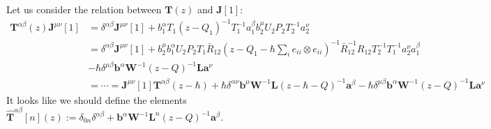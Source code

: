 \documentclass[11pt]{report}
\theoremstyle{definition}
\theoremstyle{remark}
\theoremstyle{remark}
\begin{document}

Let us consider the relation between $\mathbf{T}(z)$ and $\mathbf{J}[1]$:
\begin{align*}
\mathbf{T}^{\alpha\beta}(z) \mathbf{J}^{\mu\nu}[1]
&= \delta^{\alpha\beta} \mathbf{J}^{\mu\nu}[1] + b_1^\alpha T_1 (z-Q_1)^{-1} T_1^{-1} a_1^\beta b_2^\mu U_2 P_2 T_2^{-1} a_2^\nu \\
&= \delta^{\alpha\beta} \mathbf{J}^{\mu\nu}[1] + b_2^\mu b_1^\alpha U_2 P_2 T_1 \bar R_{12} (z-Q_1-\hbar\sum_i e_{ii} \otimes e_{ii})^{-1} \bar R_{12}^{-1} R_{12} T_2^{-1} T_1^{-1} a_2^\nu a_1^\beta \\
&- \hbar \delta^{\mu\beta} \mathbf{b}^\alpha \mathbf{W}^{-1} (z-Q)^{-1} \mathbf{L} \mathbf{a}^\nu \\
&= \cdots = \mathbf{J}^{\mu\nu}[1] \mathbf{T}^{\alpha\beta}(z-\hbar) + \hbar \delta^{\alpha\nu} \mathbf{b}^\mu \mathbf{W}^{-1} \mathbf{L} (z-\hbar-Q)^{-1} \mathbf{a}^\beta - \hbar \delta^{\mu\beta} \mathbf{b}^\alpha \mathbf{W}^{-1} (z-Q)^{-1} \mathbf{L} \mathbf{a}^\nu
\end{align*}
It looks like we should define the elements $\widehat{\mathbf{T}}^{\alpha\beta}[n](z) := \delta_{0n} \delta^{\alpha\beta} + \mathbf{b}^\alpha \mathbf{W}^{-1} \mathbf{L}^n (z-Q)^{-1} \mathbf{a}^\beta$.
\end{document}

